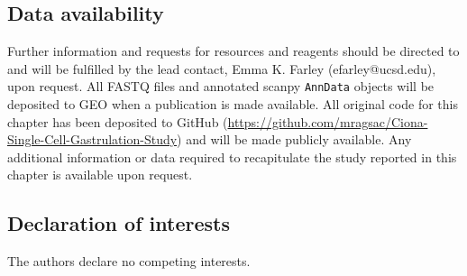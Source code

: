 \subsection{Data availability}
Further information and requests for resources and reagents should be directed to and will be fulfilled by the lead contact, Emma K. Farley (efarley@ucsd.edu), upon request. All FASTQ files and annotated scanpy \verb|AnnData| objects will be deposited to GEO when a publication is made available. All original code for this chapter has been deposited to GitHub (\url{https://github.com/mragsac/Ciona-Single-Cell-Gastrulation-Study}) and will be made publicly available. Any additional information or data required to recapitulate the study reported in this chapter is available upon request.

\subsection{Declaration of interests}
The authors declare no competing interests.
